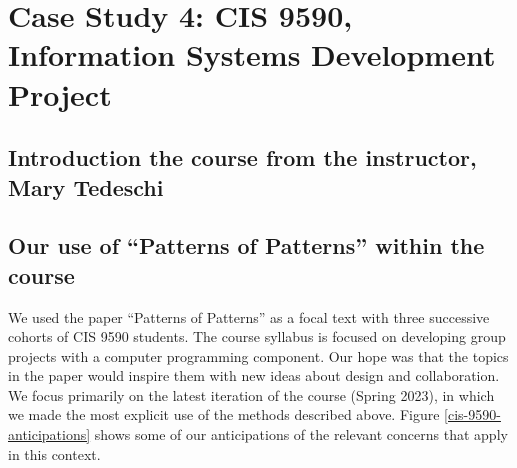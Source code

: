\documentclass[acmlarge,timestamp]{acmart}
\begin{document}


\section{Case Study 4: CIS 9590, Information Systems Development Project}

\subsection{Introduction the course from the instructor, Mary Tedeschi}


\subsection{Our use of “Patterns of Patterns” within the course}
We used the paper “Patterns of Patterns” as a focal text with three
successive cohorts of CIS 9590 students.  The course syllabus is
focused on developing group projects with a computer programming
component.  Our hope was that the topics in the paper would inspire
them with new ideas about design and collaboration.  We focus
primarily on the latest iteration of the course (Spring 2023), in
which we made the most explicit use of the methods described above.
Figure \ref{cis-9590-anticipations} shows some of our anticipations of
the relevant concerns that apply in this context.
\end{document}
